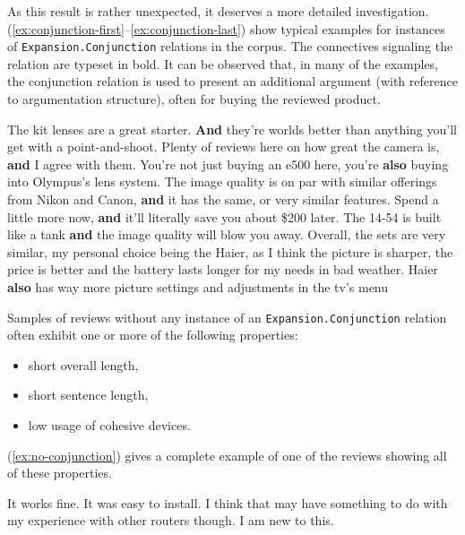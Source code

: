 \documentclass[
    a4paper,%
    12pt,%
    oneside,%
    toc=bibliography,
    final,
]{scrartcl}
\begin{document}
As this result is rather unexpected, it deserves a more detailed investigation. (\ref{ex:conjunction-first}–\ref{ex:conjunction-last}) show typical examples for instances of \lstinline|Expansion.Conjunction| relations in the corpus. The connectives signaling the relation are typeset in bold. It can be observed that, in many of the examples, the conjunction relation is used to present an additional argument (with reference to argumentation structure), often for buying the reviewed product.

\begin{exe}
\ex \label{ex:conjunction-first} The kit lenses are a great starter. \textbf{And} they're worlds better than anything you'll get with a point-and-shoot.
\ex Plenty of reviews here on how great the camera is, \textbf{and} I agree with them.
\ex You're not just buying an e500 here, you're \textbf{also} buying into Olympus's lens system.
\ex The image quality is on par with similar offerings from Nikon and Canon, \textbf{and} it has the same, or very similar features.
\ex Spend a little more now, \textbf{and} it'll literally save you about \$200 later.
\ex The 14-54 is built like a tank \textbf{and} the image quality will blow you away.
\ex \label{ex:conjunction-last} Overall, the sets are very similar, my personal choice being the Haier, as I think the picture is sharper, the price is better and the battery lasts longer for my needs in bad weather. Haier \textbf{also} has way more picture settings and adjustments in the tv's menu
\end{exe}

Samples of reviews without any instance of an \lstinline|Expansion.Conjunction| relation often exhibit one or more of the following properties:

\begin{itemize}
\item short overall length,
\item short sentence length,
\item low usage of cohesive devices.
\end{itemize}

(\ref{ex:no-conjunction}) gives a complete example of one of the reviews showing all of these properties.

\begin{exe}
\ex \label{ex:no-conjunction} It works fine.  It was easy to install.  I think that may have something to do with my experience with other routers though.  I am new to this.
\end{exe}
\end{document}
